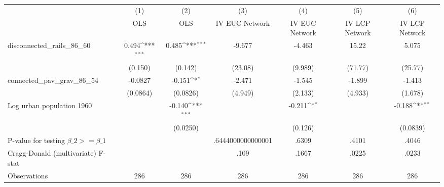 {
\def\sym#1{\ifmmode^{#1}\else\(^{#1}\)\fi}
\begin{tabular}{l*{6}{c}}
\hline\hline
                &\multicolumn{1}{c}{(1)}&\multicolumn{1}{c}{(2)}&\multicolumn{1}{c}{(3)}&\multicolumn{1}{c}{(4)}&\multicolumn{1}{c}{(5)}&\multicolumn{1}{c}{(6)}\\
                &\multicolumn{1}{c}{OLS}&\multicolumn{1}{c}{OLS}&\multicolumn{1}{c}{IV EUC Network}&\multicolumn{1}{c}{IV EUC Network}&\multicolumn{1}{c}{IV LCP Network}&\multicolumn{1}{c}{IV LCP Network}\\
\hline
disconnected\_rails\_86\_60&    0.494\sym{***}&    0.485\sym{***}&   -9.677         &   -4.463         &    15.22         &    5.075         \\
                &  (0.150)         &  (0.142)         &  (23.08)         &  (9.989)         &  (71.77)         &  (25.77)         \\
[1em]
connected\_pav\_grav\_86\_54&  -0.0827         &   -0.151\sym{*}  &   -2.471         &   -1.545         &   -1.899         &   -1.413         \\
                & (0.0864)         & (0.0826)         &  (4.949)         &  (2.133)         &  (4.933)         &  (1.678)         \\
[1em]
Log urban population 1960&                  &   -0.140\sym{***}&                  &   -0.211\sym{*}  &                  &   -0.188\sym{**} \\
                &                  & (0.0250)         &                  &  (0.126)         &                  & (0.0839)         \\
\hline
P-value for testing $\beta\_{2} >= \beta\_{1}$&                  &                  &.6444000000000001         &    .6309         &    .4101         &    .4046         \\
Cragg-Donald (multivariate) F-stat&                  &                  &     .109         &    .1667         &    .0225         &    .0233         \\
Observations    &      286         &      286         &      286         &      286         &      286         &      286         \\
\hline\hline
\end{tabular}
}
